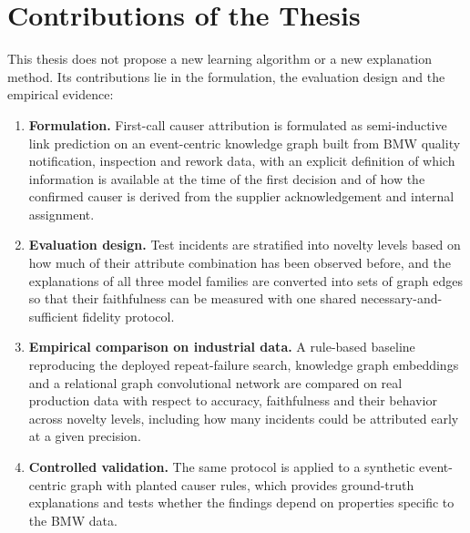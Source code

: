 \section{Contributions of the Thesis}\label{sec:intro_contrib}

This thesis does not propose a new learning algorithm or a new explanation
method. Its contributions lie in the formulation, the evaluation design and
the empirical evidence:

\begin{enumerate}
  \item \textbf{Formulation.} First-call causer attribution is formulated
    as semi-inductive link prediction on an event-centric knowledge graph
    built from BMW quality notification, inspection and rework data, with
    an explicit definition of which information is available at the time of
    the first decision and of how the confirmed causer is derived from the
    supplier acknowledgement and internal assignment.

  \item \textbf{Evaluation design.} Test incidents are stratified into
    novelty levels based on how much of their attribute combination has been
    observed before, and the explanations of all three model families are
    converted into sets of graph edges so that their faithfulness can be
    measured with one shared necessary-and-sufficient fidelity protocol.

  \item \textbf{Empirical comparison on industrial data.} A rule-based
    baseline reproducing the deployed repeat-failure search, knowledge graph
    embeddings and a relational graph convolutional network are compared on
    real production data with respect to accuracy, faithfulness and their
    behavior across novelty levels, including how many incidents could be
    attributed early at a given precision.

  \item \textbf{Controlled validation.} The same protocol is applied to a
    synthetic event-centric graph with planted causer rules, which provides
    ground-truth explanations and tests whether the findings depend on
    properties specific to the BMW data.
\end{enumerate}
